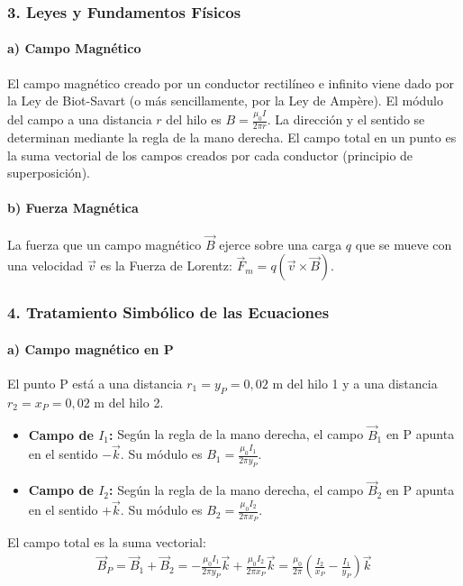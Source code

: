 \subsubsection*{3. Leyes y Fundamentos Físicos}
\paragraph*{a) Campo Magnético}
El campo magnético creado por un conductor rectilíneo e infinito viene dado por la Ley de Biot-Savart (o más sencillamente, por la Ley de Ampère). El módulo del campo a una distancia $r$ del hilo es $B = \frac{\mu_0 I}{2\pi r}$. La dirección y el sentido se determinan mediante la regla de la mano derecha. El campo total en un punto es la suma vectorial de los campos creados por cada conductor (principio de superposición).

\paragraph*{b) Fuerza Magnética}
La fuerza que un campo magnético $\vec{B}$ ejerce sobre una carga $q$ que se mueve con una velocidad $\vec{v}$ es la Fuerza de Lorentz: $\vec{F}_m = q(\vec{v} \times \vec{B})$.

\subsubsection*{4. Tratamiento Simbólico de las Ecuaciones}
\paragraph*{a) Campo magnético en P}
El punto P está a una distancia $r_1=y_P=0,02$ m del hilo 1 y a una distancia $r_2=x_P=0,02$ m del hilo 2.
\begin{itemize}
    \item \textbf{Campo de $I_1$:} Según la regla de la mano derecha, el campo $\vec{B}_1$ en P apunta en el sentido $-\vec{k}$. Su módulo es $B_1 = \frac{\mu_0 I_1}{2\pi y_P}$.
    \item \textbf{Campo de $I_2$:} Según la regla de la mano derecha, el campo $\vec{B}_2$ en P apunta en el sentido $+\vec{k}$. Su módulo es $B_2 = \frac{\mu_0 I_2}{2\pi x_P}$.
\end{itemize}
El campo total es la suma vectorial:
\begin{gather}
    \vec{B}_P = \vec{B}_1 + \vec{B}_2 = -\frac{\mu_0 I_1}{2\pi y_P} \vec{k} + \frac{\mu_0 I_2}{2\pi x_P} \vec{k} = \frac{\mu_0}{2\pi} \left( \frac{I_2}{x_P} - \frac{I_1}{y_P} \right) \vec{k}
\end{gather}
